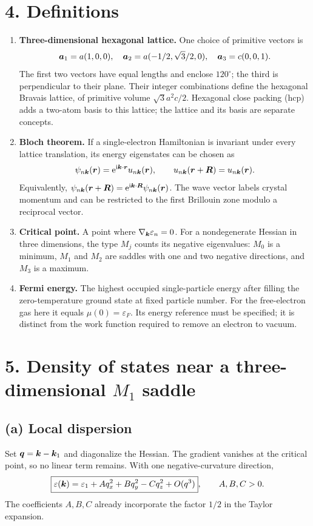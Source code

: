 \section*{4. Definitions}
\begin{enumerate}[label=(\alph*)]
\item \textbf{Three-dimensional hexagonal lattice.} One choice of primitive vectors is
\[
\boldsymbol{a}_1=a(1,0,0),\quad
\boldsymbol{a}_2=a(-1/2,\sqrt3/2,0),\quad
\boldsymbol{a}_3=c(0,0,1).
\]
The first two vectors have equal lengths and enclose $120^\circ$; the third is perpendicular to their plane. Their integer combinations define the hexagonal Bravais lattice, of primitive volume $\sqrt3a^2c/2$. Hexagonal close packing (hcp) adds a two-atom basis to this lattice; the lattice and its basis are separate concepts.
\item \textbf{Bloch theorem.} If a single-electron Hamiltonian is invariant under every lattice translation, its energy eigenstates can be chosen as
\[
\psi_{n\boldsymbol{k}}(\boldsymbol{r})=\mathrm{e}^{\mathrm{i}\boldsymbol{k}\cdot\boldsymbol{r}}u_{n\boldsymbol{k}}(\boldsymbol{r}),
\qquad u_{n\boldsymbol{k}}(\boldsymbol{r}+\boldsymbol{R})=u_{n\boldsymbol{k}}(\boldsymbol{r}).
\]
Equivalently,
$\psi_{n\boldsymbol{k}}(\boldsymbol{r}+\boldsymbol{R})=\mathrm{e}^{\mathrm{i}\boldsymbol{k}\cdot\boldsymbol{R}}\psi_{n\boldsymbol{k}}(\boldsymbol{r})$.
The wave vector labels crystal momentum and can be restricted to the first Brillouin zone modulo a reciprocal vector.
\item \textbf{Critical point.} A point where $\nabla_{\boldsymbol{k}}\varepsilon_n=0$. For a nondegenerate Hessian in three dimensions, the type $M_j$ counts its negative eigenvalues: $M_0$ is a minimum, $M_1$ and $M_2$ are saddles with one and two negative directions, and $M_3$ is a maximum.
\item \textbf{Fermi energy.} The highest occupied single-particle energy after filling the zero-temperature ground state at fixed particle number. For the free-electron gas here it equals $\mu(0)=\varepsilon_F$. Its energy reference must be specified; it is distinct from the work function required to remove an electron to vacuum.
\end{enumerate}

\section*{5. Density of states near a three-dimensional $M_1$ saddle}
\subsection*{(a) Local dispersion}
Set $\boldsymbol{q}=\boldsymbol{k}-\boldsymbol{k}_1$ and diagonalize the Hessian. The gradient vanishes at the critical point, so no linear term remains. With one negative-curvature direction,
\[
\boxed{\varepsilon(\boldsymbol{k})
=\varepsilon_1+Aq_x^2+Bq_y^2-Cq_z^2+O(q^3)},
\qquad A,B,C>0.
\]
The coefficients $A,B,C$ already incorporate the factor $1/2$ in the Taylor expansion.


